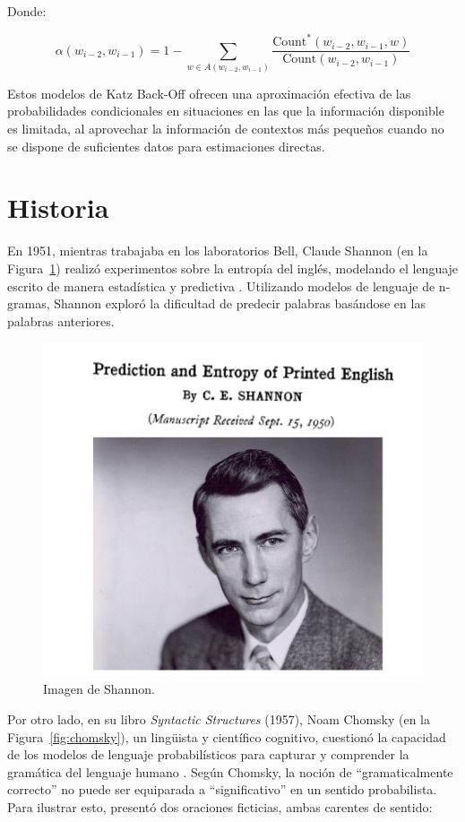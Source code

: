 Donde:

\[
\alpha(w_{i-2}, w_{i-1}) = 1 - \sum_{w \in A(w_{i-2}, w_{i-1})} \frac{\text{Count}^*(w_{i-2}, w_{i-1}, w)}{\text{Count}(w_{i-2}, w_{i-1})}
\]

Estos modelos de Katz Back-Off ofrecen una aproximación efectiva de las probabilidades condicionales en situaciones en las que la información disponible es limitada, al aprovechar la información de contextos más pequeños cuando no se dispone de suficientes datos para estimaciones directas.

\section{Historia}
En 1951, mientras trabajaba en los laboratorios Bell, Claude Shannon (en la Figura~\ref{fig:shannon}) realizó experimentos sobre la entropía del inglés, modelando el lenguaje escrito de manera estadística y predictiva \cite{shannon1951prediction}. Utilizando modelos de lenguaje de n-gramas, Shannon exploró la dificultad de predecir palabras basándose en las palabras anteriores.

\begin{figure}[h]
    \centering
    \includegraphics[scale = 0.4]{pics/shannon.png}
    \caption{Imagen de Shannon.}
    \label{fig:shannon}
\end{figure}

Por otro lado, en su libro \textit{Syntactic Structures} (1957), Noam Chomsky (en la Figura~\ref{fig:chomsky}), un lingüista y científico cognitivo, cuestionó la capacidad de los modelos de lenguaje probabilísticos para capturar y comprender la gramática del lenguaje humano \cite{chomsky2009syntactic}. Según Chomsky, la noción de ``gramaticalmente correcto'' no puede ser equiparada a ``significativo'' en un sentido probabilista. Para ilustrar esto, presentó dos oraciones ficticias, ambas carentes de sentido:

